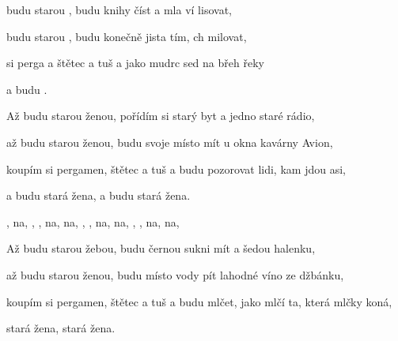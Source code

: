 

\zs
    budu starou , budu  knihy číst
   a mla ví lisovat,

    budu starou , budu  konečně jista
   tím,  ch milovat,

    si perga a štětec a tuš
   a jako  mudrc sed na břeh řeky

   a budu    
    . ~  ~  ~ 
\ks

\zs
   Až budu starou ženou, pořídím si starý byt
   a jedno staré rádio,

   až budu starou ženou, budu svoje místo mít
   u okna kavárny Avion,

   koupím si pergamen, štětec a tuš
   a budu pozorovat lidi, kam jdou asi,

   a budu stará žena, a budu stará žena.
\ks

\zr
{}, na, , , na, na, , , na, na, , , na, na, 
\kr

\zs
   Až budu starou žebou, budu černou sukni mít
   a šedou halenku,

   až budu starou ženou, budu místo vody pít
   lahodné víno ze džbánku,

   koupím si pergamen, štětec a tuš
   a budu mlčet, jako mlčí ta, která mlčky koná,

   stará žena, stará žena.
\ks

\kp